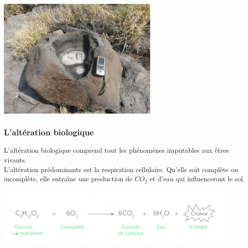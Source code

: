 \documentclass[a4paper,11pt]{article}
\begin{document}
\begin{itemize}
  \medbreak
  \begin{center}
    \includegraphics[width=8cm]{Images/Erosion/Haloclastie_vasque_basalte_Hawaii.jpg}
  \end{center}
  \medbreak

\end{itemize}

\subsubsection{L'altération biologique}

L'altération biologique comprend tout les phénomènes imputables aux êtres vivants. \\
L'altération prédominante est la respiration cellulaire.
Qu'elle soit complète ou incomplète, elle entraîne une production de $CO_2$ et d'eau qui influenceront le sol.

\begin{center}
  \includegraphics[width=12cm]{Images/Erosion/Respiration_cellulaire.png}
\end{center}
\end{document}
